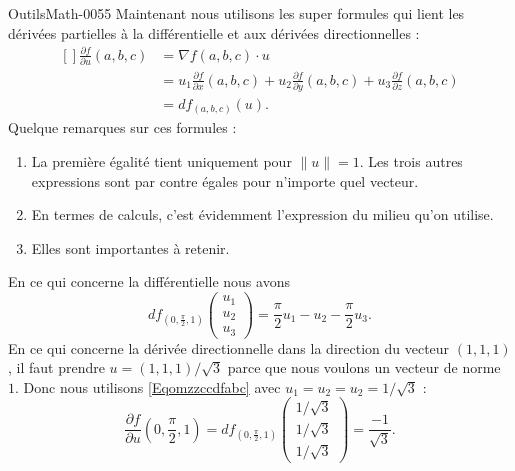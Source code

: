 \begin{corrige}{OutilsMath-0055}
    Maintenant nous utilisons les super formules qui lient les dérivées partielles à la différentielle et aux dérivées directionnelles :
    \begin{equation}
        \begin{aligned}[]
            \frac{ \partial f }{ \partial u }(a,b,c)&=\nabla f(a,b,c)\cdot u\\
            &=u_1\frac{ \partial f }{ \partial x }(a,b,c)+u_2\frac{ \partial f }{ \partial y }(a,b,c)+u_3\frac{ \partial f }{ \partial z }(a,b,c)\\
            &=df_{(a,b,c)}(u).
        \end{aligned}
    \end{equation}
    Quelque remarques sur ces formules :
    \begin{enumerate}
        \item
            La première égalité tient uniquement pour $\| u \|=1$. Les trois autres expressions sont par contre égales pour n'importe quel vecteur.
        \item
            En termes de calculs, c'est évidemment l'expression du milieu qu'on utilise.
        \item
            Elles sont importantes à retenir.
    \end{enumerate}
    En ce qui concerne la différentielle nous avons
    \begin{equation}        \label{Eqomzzccdfabc}
        df_{(0,\frac{ \pi }{2},1)}\begin{pmatrix}
            u_1    \\ 
            u_2    \\ 
            u_3    
        \end{pmatrix}=\frac{ \pi }{2}u_1-u_2-\frac{ \pi }{2}u_3.
    \end{equation}
    En ce qui concerne la dérivée directionnelle dans la direction du vecteur $(1,1,1)$, il faut prendre $u=(1,1,1)/\sqrt{3}$ parce que nous voulons un vecteur de norme $1$. Donc nous utilisons \eqref{Eqomzzccdfabc} avec $u_1=u_2=u_2=1/\sqrt{3}$ :
    \begin{equation}
        \frac{ \partial f }{ \partial u }(0,\frac{ \pi }{2},1)=df_{(0,\frac{ \pi }{2},1)}\begin{pmatrix}
            1/\sqrt{3}    \\ 
            1/\sqrt{3}    \\ 
            1/\sqrt{3}    
        \end{pmatrix}=\frac{ -1 }{ \sqrt{3} }.
    \end{equation}
    
    
\end{corrige}
